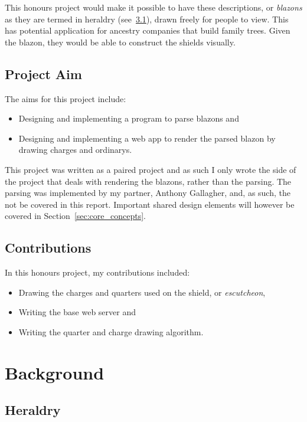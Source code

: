 \documentclass[nobib, a4paper, twoside, justified]{tufte-book}
\makeatletter
\newcommand{\charge}{\gls{charge}\@\xspace}
\newcommand{\charges}{\glspl{charge}\@\xspace}
\newcommand{\quarter}{\gls{quarter}\@\xspace}
\newcommand{\quarters}{\glspl{quarter}\@\xspace}
\newcommand{\blazon}{\gls{blazon}\@\xspace}
\newcommand{\blazons}{\glspl{blazon}\@\xspace}
\makeatother
\begin{document}
This honours project would make it possible to have these descriptions, or \textit{\blazons} as
they are termed in heraldry (see~\ref{sec:heraldry}), drawn freely for people to view. This has
potential application for ancestry companies that build family trees. Given the
\blazon, they would be able to construct the shields visually.

\section{Project Aim}%
\label{sec:project_aim}

The aims for this project include:

\begin{itemize}
  \item Designing and implementing a program to parse \blazons and
  \item Designing and implementing a web app to render the parsed \blazon by drawing \charges and
    \glspl{ordinary}.
\end{itemize}

This project was written as a paired project and as such I only wrote the side of the project that
deals with rendering the \blazons, rather than the parsing. The parsing was implemented by my
partner, Anthony Gallagher, and, as such, the not be covered in this report.  Important shared
design elements will however be covered in Section~\ref{sec:core_concepts}.

\section{Contributions}%
\label{sec:contributions}

In this honours project, my contributions included:

\begin{itemize}
  \item Drawing the \charges and \quarters used on the shield, or \textit{\gls{escutcheon}},
  \item Writing the base web server and
  \item Writing the \quarter and \charge drawing algorithm.
\end{itemize}

\chapter{Background}\label{cha:background}

\section{Heraldry}\label{sec:heraldry}
\end{document}
